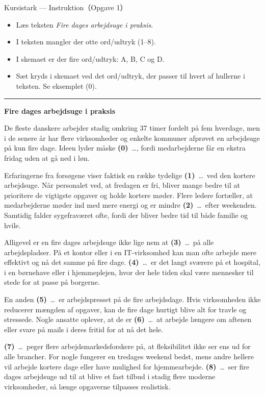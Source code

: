 \begin{emailbox}{Kursistark --- Instruktion（Opgave 1）}
\begin{itemize}
  \item Læs teksten \textit{Fire dages arbejdsuge i praksis}.
  \item I teksten mangler der otte ord/udtryk (1--8).
  \item I skemaet er der fire ord/udtryk: A, B, C og D.
  \item Sæt kryds i skemaet ved det ord/udtryk, der passer til hvert af hullerne i teksten. Se eksemplet (0).
\end{itemize}

\vspace{0.35em}
\hrule
\vspace{0.45em}

\textbf{\color{NCDNavy}Fire dages arbejdsuge i praksis}

\vspace{0.3em}
De fleste danskere arbejder stadig omkring 37 timer fordelt på fem hverdage, men i de senere år har flere virksomheder og enkelte kommuner afprøvet en arbejdsuge på kun fire dage. Ideen lyder måske \textbf{(0)}\ \ldots, fordi medarbejderne får en ekstra fridag uden at gå ned i løn.

\vspace{0.25em}
Erfaringerne fra forsøgene viser faktisk en række tydelige \textbf{(1)}\ \ldots\ ved den kortere arbejdsuge. Når personalet ved, at fredagen er fri, bliver mange bedre til at prioritere de vigtigste opgaver og holde kortere møder. Flere ledere fortæller, at medarbejderne møder ind med mere energi og er mindre \textbf{(2)}\ \ldots\ efter weekenden. Samtidig falder sygefraværet ofte, fordi der bliver bedre tid til både familie og hvile.

\vspace{0.25em}
Alligevel er en fire dages arbejdsuge ikke lige nem at \textbf{(3)}\ \ldots\ på alle arbejdspladser. På et kontor eller i en IT-virksomhed kan man ofte arbejde mere effektivt og nå det samme på fire dage. \textbf{(4)}\ \ldots\ er det langt sværere på et hospital, i en børnehave eller i hjemmeplejen, hvor der hele tiden skal være mennesker til stede for at passe på borgerne.

\vspace{0.25em}
En anden \textbf{(5)}\ \ldots\ er arbejdspresset på de fire arbejdsdage. Hvis virksomheden ikke reducerer mængden af opgaver, kan de fire dage hurtigt blive alt for travle og stressede. Nogle ansatte oplever, at de er \textbf{(6)}\ \ldots\ at arbejde længere om aftenen eller svare på mails i deres fritid for at nå det hele.

\vspace{0.25em}
\textbf{(7)}\ \ldots\ peger flere arbejdsmarkedsforskere på, at fleksibilitet ikke ser ens ud for alle brancher. For nogle fungerer en tredages weekend bedst, mens andre hellere vil arbejde kortere dage eller have mulighed for hjemmearbejde. \textbf{(8)}\ \ldots\ ser fire dages arbejdsuge ud til at blive et fast tilbud i stadig flere moderne virksomheder, så længe opgaverne tilpasses realistisk.
\end{emailbox}

